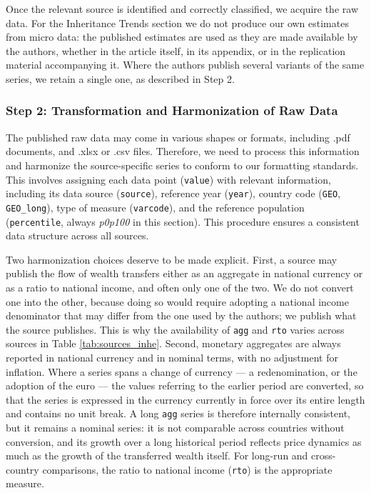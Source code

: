 \documentclass[
]{article}
\begin{document}
Once the relevant source is identified and correctly classified, we
acquire the raw data. For the Inheritance Trends section we do not
produce our own estimates from micro data: the published estimates are
used as they are made available by the authors, whether in the article
itself, in its appendix, or in the replication material accompanying it.
Where the authors publish several variants of the same series, we retain
a single one, as described in Step 2.

\subsubsection{Step 2: Transformation and Harmonization of Raw
Data}\label{step-2-transformation-and-harmonization-of-raw-data}

The published raw data may come in various shapes or formats, including
.pdf documents, and .xlsx or .csv files. Therefore, we need to process
this information and harmonize the source-specific series to conform to
our formatting standards. This involves assigning each data point
(\texttt{value}) with relevant information, including its data source
(\texttt{source}), reference year (\texttt{year}), country code
(\texttt{GEO}, \texttt{GEO\_long}), type of measure (\texttt{varcode}),
and the reference population (\texttt{percentile}, always \emph{p0p100}
in this section). This procedure ensures a consistent data structure
across all sources.

Two harmonization choices deserve to be made explicit. First, a source
may publish the flow of wealth transfers either as an aggregate in
national currency or as a ratio to national income, and often only one
of the two. We do not convert one into the other, because doing so would
require adopting a national income denominator that may differ from the
one used by the authors; we publish what the source publishes. This is
why the availability of \texttt{agg} and \texttt{rto} varies across
sources in Table \ref{tab:sources_inhe}. Second, monetary aggregates are
always reported in national currency and in nominal terms, with no
adjustment for inflation. Where a series spans a change of currency ---
a redenomination, or the adoption of the euro --- the values referring
to the earlier period are converted, so that the series is expressed in
the currency currently in force over its entire length and contains no
unit break. A long \texttt{agg} series is therefore internally
consistent, but it remains a nominal series: it is not comparable across
countries without conversion, and its growth over a long historical
period reflects price dynamics as much as the growth of the transferred
wealth itself. For long-run and cross-country comparisons, the ratio to
national income (\texttt{rto}) is the appropriate measure.
\end{document}
